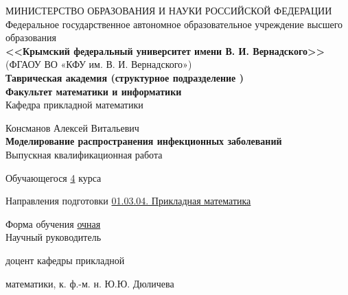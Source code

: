     \begin{titlepage}
    \newpage
	\pagestyle{empty} %
    \begin{center}
    
	
	{\fontsize{13}{15.6}\selectfont МИНИСТЕРСТВО ОБРАЗОВАНИЯ И НАУКИ РОССИЙСКОЙ ФЕДЕРАЦИИ}\\ 
    \normalsize  {Федеральное государственное автономное образовательное учреждение высшего образования} \\
    
    \large \textbf{<<Крымский  федеральный  университет имени В. И. Вернадского>>} \\  \vspace{2mm}
    (ФГАОУ ВО «КФУ им. В. И. Вернадского»)\\
    
    \textbf{Таврическая академия (структурное подразделение ) \\
    \vspace{2mm}
    Факультет математики и информатики} \\
    \vspace{2mm}
    Кафедра прикладной математики 
    \end{center}
    \vspace{1em}

    \begin{center}
	\normalsize Консманов Алексей Витальевич \\
    \LARGE \textbf{Моделирование распространения инфекционных заболеваний} \\
    \vspace{1em}
    \normalsize Выпускная квалификационная работа 
    \end{center}

    \vspace{1em}
    Обучающегося \hspace*{3cm} \underline{4} курса 
    
    
    Направления подготовки\hspace*{8mm} \underline{01.03.04. Прикладная математика}
    
        
    Форма обучения\hspace*{2.75cm} \underline{очная}\\
    
    
    Научный руководитель
    
    доцент кафедры прикладной  
    
   математики, к. ф.-м. н. \hspace*{5cm} Ю.Ю. Дюличева
   

\end{titlepage}
